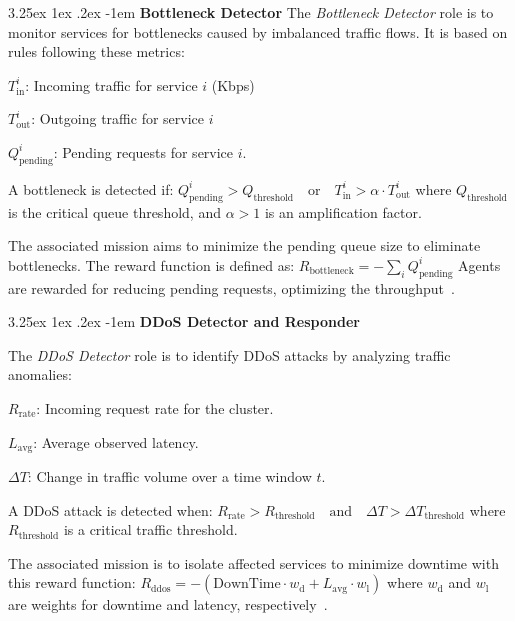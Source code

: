 \documentclass[conference]{IEEEtran}
\makeatletter
\renewcommand\paragraph{\@startsection{paragraph}{5}{\z@}%
  {3.25ex \@plus1ex \@minus.2ex}%
  {-1em}%
  {\normalfont\normalsize\bfseries}}
\makeatother
\begin{document}
\noindent \paragraph{\textbf{Bottleneck Detector}} 
%
The \textit{Bottleneck Detector} role is to monitor services for bottlenecks caused by imbalanced traffic flows. It is based on rules following these metrics:
\begin{enumerate*}[label={}, itemjoin={;\quad }]
    \item \( T_{\text{in}}^i \): Incoming traffic for service \( i \) (Kbps)
    \item \( T_{\text{out}}^i \): Outgoing traffic for service \( i \)
    \item \( Q_{\text{pending}}^i \): Pending requests for service \( i \).
\end{enumerate*}
A bottleneck is detected if: $Q_{\text{pending}}^i > Q_{\text{threshold}} \quad \text{or} \quad T_{\text{in}}^i > \alpha \cdot T_{\text{out}}^i$
where \( Q_{\text{threshold}} \) is the critical queue threshold, and \( \alpha > 1 \) is an amplification factor.

The associated mission aims to minimize the pending queue size to eliminate bottlenecks. The reward function is defined as: $R_{\text{bottleneck}} = - \sum_{i} Q_{\text{pending}}^i$
Agents are rewarded for reducing pending requests, optimizing the throughput~\cite{burns2016borg}.

\noindent \paragraph{\textbf{DDoS Detector and Responder}}

The \textit{DDoS Detector} role is to identify DDoS attacks by analyzing traffic anomalies:
\begin{enumerate*}[label={}, itemjoin={;\quad }]
    \item \( R_{\text{rate}} \): Incoming request rate for the cluster.
    \item \( L_{\text{avg}} \): Average observed latency.
    \item \( \Delta T \): Change in traffic volume over a time window \( t \).
\end{enumerate*}
A DDoS attack is detected when:
$R_{\text{rate}} > R_{\text{threshold}} \quad \text{and} \quad \Delta T > \Delta T_{\text{threshold}}$
where \( R_{\text{threshold}} \) is a critical traffic threshold.

The associated mission is to isolate affected services to minimize downtime with this reward function:
$R_{\text{ddos}} = - \left( \text{DownTime} \cdot w_{\text{d}} + L_{\text{avg}} \cdot w_{\text{l}} \right)$
where \( w_{\text{d}} \) and \( w_{\text{l}} \) are weights for downtime and latency, respectively~\cite{Liu2018}.
\end{document}
